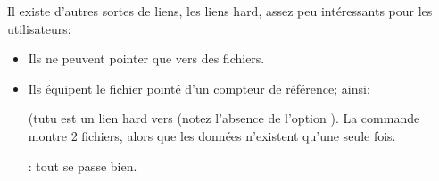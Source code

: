 Il existe d'autres sortes de liens, les liens \og hard\fg, assez peu
intéressants pour les utilisateurs:\label{hardlink}
\begin{itemize}
\item Ils ne peuvent pointer que vers des fichiers.
\item Ils équipent le fichier pointé d'un compteur de référence;
  ainsi:

   (tutu est un lien \og hard\fg{} vers 
  (notez l'absence de l'option ). La commande  montre
    2 fichiers, alors que les données n'existent qu'une seule fois.


   : tout se passe bien.
\end{itemize}
  
  
